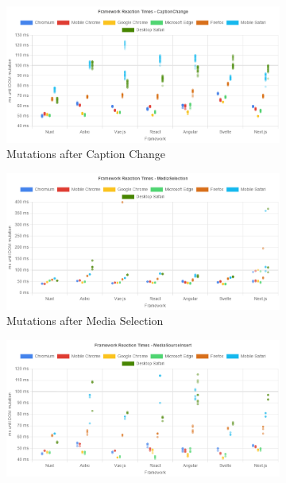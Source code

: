 \documentclass[a4paper, 12pt]{article}
\begin{document}
\begin{figure}[ht!]
  \centering
  \begin{subfigure}{0.8\linewidth}
    \begin{center}
      \includegraphics[width=\linewidth, keepaspectratio]{img/playwright-results/userActions_byUserAction/captionChange.png}
    \end{center}
    \caption{Mutations after Caption Change}\label{subfig:PW:captionChange}
  \end{subfigure}
  \begin{subfigure}{0.8\linewidth}
    \begin{center}
      \includegraphics[width=\linewidth, keepaspectratio]{img/playwright-results/userActions_byUserAction/mediaSelection.png}
    \end{center}
    \caption{Mutations after Media Selection}\label{subfig:PW:mediaSelection}
  \end{subfigure}
  \begin{subfigure}{0.8\linewidth}
    \begin{center}
      \includegraphics[width=\linewidth, keepaspectratio]{img/playwright-results/userActions_byUserAction/mediaSourceInsert.png}

\end{center}
\end{subfigure}
\end{figure}
\end{document}
